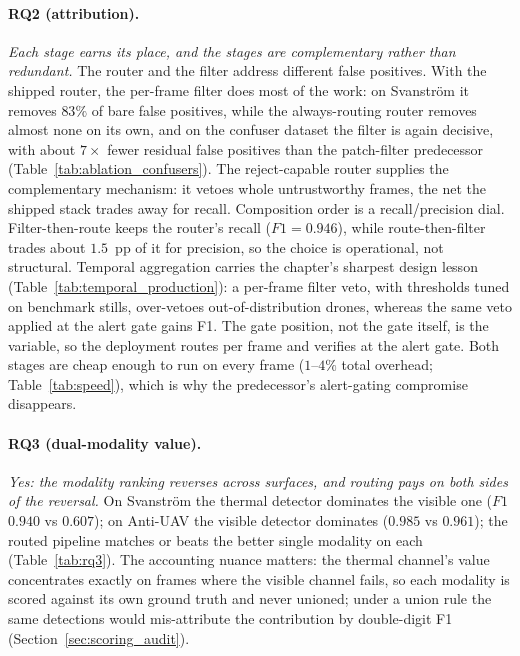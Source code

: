 \paragraph{RQ2 (attribution).}
\emph{Each stage earns its place, and the stages are complementary rather than redundant.} The router and the filter address different false positives. With the shipped router, the per-frame filter does most of the work: on Svanstr\"om it removes $83\%$ of bare false positives, while the always-routing router removes almost none on its own, and on the confuser dataset the filter is again decisive, with about $7\times$ fewer residual false positives than the patch-filter predecessor (Table~\ref{tab:ablation_confusers}). The reject-capable router supplies the complementary mechanism: it vetoes whole untrustworthy frames, the net the shipped stack trades away for recall. Composition order is a recall/precision dial. Filter-then-route keeps the router's recall ($F1=0.946$), while route-then-filter trades about $1.5$~pp of it for precision, so the choice is operational, not structural. Temporal aggregation carries the chapter's sharpest design lesson (Table~\ref{tab:temporal_production}): a per-frame filter veto, with thresholds tuned on benchmark stills, over-vetoes out-of-distribution drones, whereas the same veto applied at the alert gate gains F1. The gate position, not the gate itself, is the variable, so the deployment routes per frame and verifies at the alert gate. Both stages are cheap enough to run on every frame ($1$--$4\%$ total overhead; Table~\ref{tab:speed}), which is why the predecessor's alert-gating compromise disappears.

\paragraph{RQ3 (dual-modality value).}
\emph{Yes: the modality ranking reverses across surfaces, and routing pays on both sides of the reversal.} On Svanstr\"om the thermal detector dominates the visible one ($F1$ $0.940$ vs $0.607$); on Anti-UAV the visible detector dominates ($0.985$ vs $0.961$); the routed pipeline matches or beats the better single modality on each (Table~\ref{tab:rq3}). The accounting nuance matters: the thermal channel's value concentrates exactly on frames where the visible channel fails, so each modality is scored against its own ground truth and never unioned; under a union rule the same detections would mis-attribute the contribution by double-digit F1 (Section~\ref{sec:scoring_audit}).


